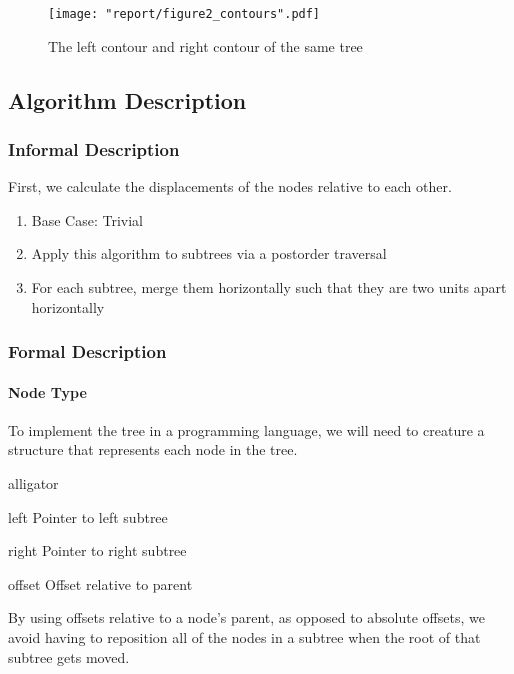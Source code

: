 \documentclass[11pt]{report}
\begin{document}
\begin{figure}[H]
    \texttt{[image: "report/figure2\_contours".pdf]}
    \caption{The left contour and right contour of the same tree}
\end{figure}

\subsection{Algorithm Description}
\subsubsection{Informal Description}
First, we calculate the displacements of the nodes relative to each other.

\begin{enumerate}
    \item Base Case: Trivial
    \item Apply this algorithm to subtrees via a postorder traversal
    \item For each subtree, merge them horizontally such that they are two units apart horizontally
\end{enumerate}

\subsubsection{Formal Description}
\paragraph{Node Type}
To implement the tree in a programming language, we will need to creature a structure that represents each node in the tree.
\begin{labeling}{alligator}
    \item [left] Pointer to left subtree
    \item [right] Pointer to right subtree
    \item [offset] Offset relative to parent
\end{labeling}

By using offsets relative to a node's parent, as opposed to absolute offsets, we avoid having to reposition all of the nodes in a subtree when the root of that subtree gets moved.
\end{document}
